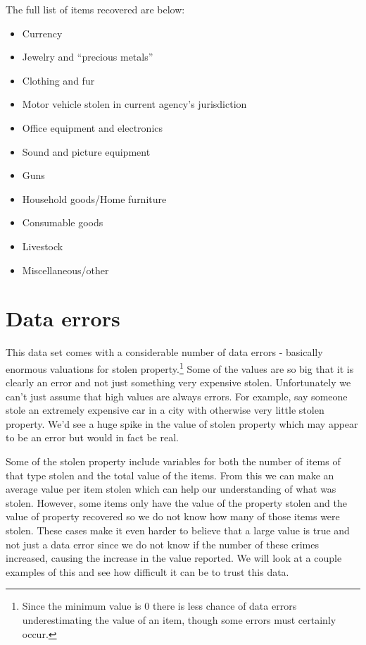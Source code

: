 \documentclass[
]{krantz}
\providecommand{\tightlist}{%
  \setlength{\itemsep}{0pt}\setlength{\parskip}{0pt}}
\begin{document}
The full list of items recovered are below:

\begin{itemize}
\tightlist
\item
  Currency
\item
  Jewelry and ``precious metals''
\item
  Clothing and fur
\item
  Motor vehicle stolen in current agency's jurisdiction
\item
  Office equipment and electronics
\item
  Sound and picture equipment
\item
  Guns
\item
  Household goods/Home furniture
\item
  Consumable goods
\item
  Livestock
\item
  Miscellaneous/other
\end{itemize}

\section{Data errors}\label{data-errors}

This data set comes with a considerable number of data errors
- basically enormous valuations for stolen
property.\footnote{Since the minimum value is 0 there is
  less chance of data errors underestimating the value of an
  item, though some errors must certainly occur.} Some of
the values are so big that it is clearly an error and not
just something very expensive stolen. Unfortunately we can't
just assume that high values are always errors. For example,
say someone stole an extremely expensive car in a city with
otherwise very little stolen property. We'd see a huge spike
in the value of stolen property which may appear to be an
error but would in fact be real.

Some of the stolen property include variables for both the
number of items of that type stolen and the total value of
the items. From this we can make an average value per item
stolen which can help our understanding of what was stolen.
However, some items only have the value of the property
stolen and the value of property recovered so we do not know
how many of those items were stolen. These cases make it
even harder to believe that a large value is true and not
just a data error since we do not know if the number of
these crimes increased, causing the increase in the value
reported. We will look at a couple examples of this and see
how difficult it can be to trust this data.
\end{document}
